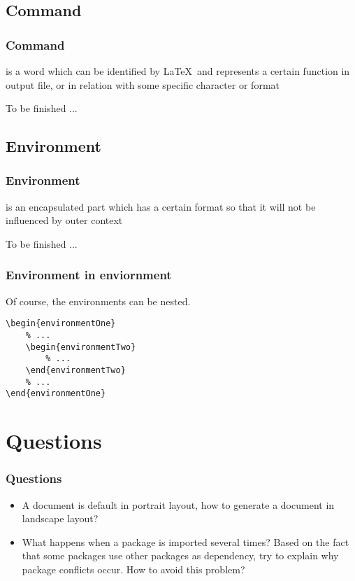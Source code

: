 \subsection{Command}

\begin{frame}[fragile]
	\frametitle{Command}
	\begin{definition}
		 is a word which can be identified by \LaTeX\ and represents a certain function in output file, or in relation with some specific character or format
	\end{definition}

	To be finished ...
\end{frame}

\subsection{Environment}

\begin{frame}[fragile]
	\frametitle{Environment}
	\begin{definition}
		 is an encapsulated part which has a certain format so that it will not be influenced by outer context
	\end{definition}

	To be finished ...
\end{frame}

\begin{frame}[fragile]
	\frametitle{Environment in enviornment}
	Of course, the environments can be nested. \\

	\begin{example}
		\begin{verbatim}
\begin{environmentOne}
    % ...
    \begin{environmentTwo}
        % ...
    \end{environmentTwo}
    % ...
\end{environmentOne}
		\end{verbatim}
	\end{example}
\end{frame}

\section*{Questions}

\begin{frame}
	\frametitle{Questions}
	\begin{itemize}
		\item A document is default in portrait layout, how to generate a document in landscape layout?
		\item What happens when a package is imported several times? Based on the fact that some packages use other packages as dependency, try to explain why package conflicts occur. How to avoid this problem?

	\end{itemize}
\end{frame}

